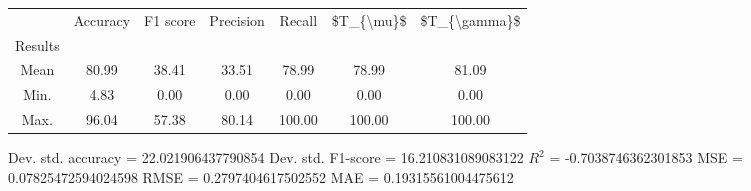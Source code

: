\begin{tabular}{|c|c|c|c|c|c|c|}
\toprule
{} &  Accuracy &  F1 score &  Precision &  Recall &  \$T\_\{\textbackslash mu\}\$ &  \$T\_\{\textbackslash gamma\}\$ \\
Results &           &           &            &         &            &               \\
\hline
Mean    &     80.99 &     38.41 &      33.51 &   78.99 &      78.99 &         81.09 \\
Min.    &      4.83 &      0.00 &       0.00 &    0.00 &       0.00 &          0.00 \\
Max.    &     96.04 &     57.38 &      80.14 &  100.00 &     100.00 &        100.00 \\
\bottomrule
\end{tabular}

 Dev. std. accuracy = 22.021906437790854
 Dev. std. F1-score = 16.210831089083122
 $R^2$ = -0.7038746362301853
 MSE = 0.07825472594024598
 RMSE = 0.2797404617502552
 MAE = 0.19315561004475612